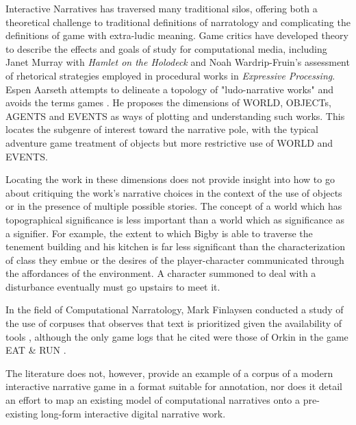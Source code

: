 Interactive Narratives has traversed many traditional silos, offering
both a theoretical challenge to traditional definitions of narratology
and complicating the definitions of game with extra-ludic
meaning. Game critics have developed theory to describe the effects
and goals of study for computational media, including Janet Murray
with \emph{Hamlet on the Holodeck} and Noah Wardrip-Fruin's assessment of
rhetorical strategies employed in procedural works in \emph{Expressive
Processing}\cite{Wardrip-Fruin2009}. Espen Aarseth attempts to
delineate a topology of "ludo-narrative works" and avoids the terms
games \cite{Aarseth2012}. He proposes the dimensions of WORLD,
OBJECTs, AGENTS and EVENTS as ways of plotting and understanding such
works. This locates the subgenre of interest toward the narrative
pole, with the typical adventure game treatment of objects but more
restrictive use of WORLD and EVENTS.

Locating the work in these dimensions does not provide insight into
how to go about critiquing the work's narrative choices in the context
of the use of objects or in the presence of multiple possible
stories. The concept of a world which has topographical significance
is less important than a world which as significance as a
signifier. For example, the extent to which Bigby is able to traverse
the tenement building and his kitchen is far less significant than the
characterization of class they embue or the desires of the
player-character communicated through the affordances of the
environment. A character summoned to deal with a disturbance
eventually must go upstairs to meet it.

In the field of Computational Narratology, Mark Finlaysen conducted a
study of the use of corpuses that observes that text is prioritized
given the availability of tools \cite{Finlayson2013}, although the
only game logs that he cited were those of Orkin in the game EAT \& RUN
\cite{Orkin2010}. 

The literature does not, however, provide an example of a corpus of a
modern interactive narrative game in a format suitable for annotation,
nor does it detail an effort to map an existing model of computational
narratives onto a pre-existing long-form interactive digital
narrative work.

